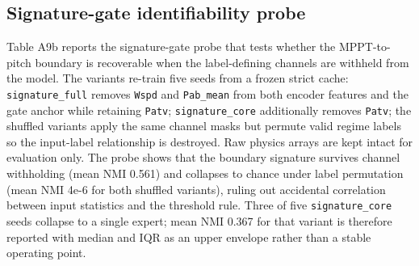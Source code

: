 \documentclass[
  journal]{IEEEtran}
\begin{document}
\FloatBarrier

\subsection*{Signature-gate identifiability
probe}\label{signature-gate-identifiability-probe}

Table A9b reports the signature-gate probe that tests whether the
MPPT-to-pitch boundary is recoverable when the label-defining channels
are withheld from the model. The variants re-train five seeds from a
frozen strict cache: \texttt{signature\_full} removes \texttt{Wspd} and
\texttt{Pab\_mean} from both encoder features and the gate anchor while
retaining \texttt{Patv}; \texttt{signature\_core} additionally removes
\texttt{Patv}; the shuffled variants apply the same channel masks but
permute valid regime labels so the input-label relationship is
destroyed. Raw physics arrays are kept intact for evaluation only. The
probe shows that the boundary signature survives channel withholding
(mean NMI 0.561) and collapses to chance under label permutation (mean
NMI 4e-6 for both shuffled variants), ruling out accidental correlation
between input statistics and the threshold rule. Three of five
\texttt{signature\_core} seeds collapse to a single expert; mean NMI
0.367 for that variant is therefore reported with median and IQR as an
upper envelope rather than a stable operating point.
\end{document}
